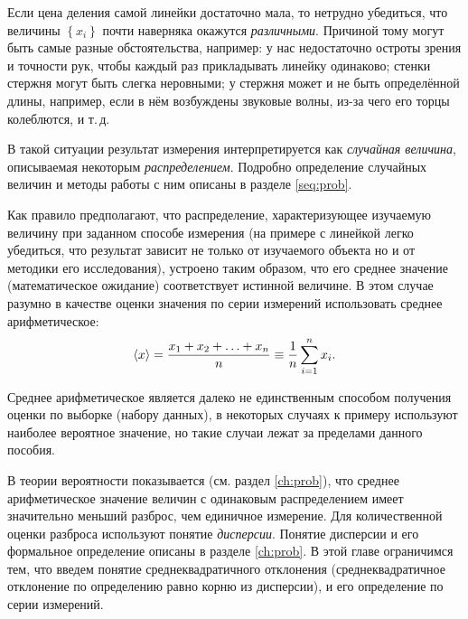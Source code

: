 Если цена деления самой линейки достаточно мала, то нетрудно убедиться, что величины $\left\{ x_{i}\right\} $
почти наверняка окажутся \emph{различными}. Причиной тому могут быть
самые разные обстоятельства, например: у нас недостаточно остроты
зрения и точности рук, чтобы каждый раз прикладывать линейку одинаково;
стенки стержня могут быть слегка неровными; у стержня может и не быть
определённой длины, например, если в нём возбуждены звуковые волны,
из-за чего его торцы колеблются, и т.\,д.

В такой ситуации результат измерения интерпретируется как \emph{случайная величина}, описываемая некоторым \emph{распределением}. Подробно определение случайных величин и методы работы с ним описаны в разделе \ref{seq:prob}.

Как правило предполагают, что распределение, характеризующее изучаемую величину при заданном способе измерения (на примере с линейкой легко убедиться, что результат зависит не только от изучаемого объекта но и от методики его исследования), устроено таким образом, что его среднее значение (математическое ожидание) соответствует истинной величине. 
В этом случае разумно в качестве оценки значения по серии измерений использовать среднее арифметическое:
\begin{equation}
    \left<x\right>=\frac{x_{1}+x_{2}+\ldots+x_{n}}{n}\equiv\frac{1}{n}\sum\limits _{i=1}^{n}x_{i}\label{eq:average}.
\end{equation}

Среднее арифметическое является далеко не единственным способом получения оценки по выборке (набору данных), в некоторых случаях к примеру используют наиболее вероятное значение, но такие случаи лежат за пределами данного пособия.

В теории вероятности показывается (см. раздел \ref{ch:prob}), что среднее арифметическое значение величин с одинаковым распределением имеет значительно меньший разброс, чем единичное измерение. Для количественной оценки разброса используют понятие \emph{дисперсии}. Понятие дисперсии и его формальное определение описаны в разделе \ref{ch:prob}. В этой главе ограничимся тем, что введем понятие среднеквадратичного отклонения (среднеквадратичное отклонение по определению равно корню из дисперсии), и его определение по серии измерений.


